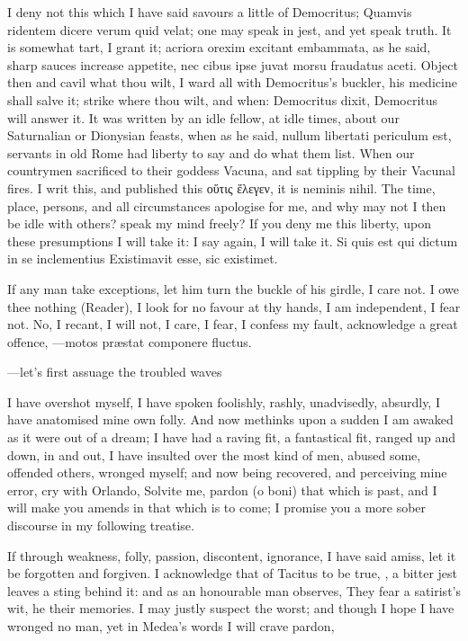 {I deny not this which I have said savours a little of Democritus; 
Quamvis ridentem dicere verum quid velat; one may speak in jest, and
yet speak truth. It is somewhat tart, I grant it; acriora orexim
excitant embammata, as he said, sharp sauces increase appetite,
nec cibus ipse juvat morsu fraudatus aceti. Object then and cavil
what thou wilt, I ward all with Democritus's buckler, his medicine
shall salve it; strike where thou wilt, and when: Democritus dixit,
Democritus will answer it. It was written by an idle fellow, at idle
times, about our Saturnalian or Dionysian feasts, when as he said,
nullum libertati periculum est, servants in old Rome had liberty to say
and do what them list. When our countrymen sacrificed to their goddess
Vacuna, and sat tippling by their Vacunal fires. I writ this, and
published this οὕτις ἕλεγεν, it is neminis nihil. The time, place,
persons, and all circumstances apologise for me, and why may not I then
be idle with others? speak my mind freely? If you deny me this liberty,
upon these presumptions I will take it: I say again, I will take it.
Si quis est qui dictum in se inclementius
Existimavit esse, sic existimet.

If any man take exceptions, let him turn the buckle of his girdle, I
care not. I owe thee nothing (Reader), I look for no favour at thy
hands, I am independent, I fear not.
No, I recant, I will not, I care, I fear, I confess my fault,
acknowledge a great offence,
---motos pr\ae{}stat componere fluctus.

---let's first assuage the troubled waves

I have overshot myself, I have spoken foolishly, rashly, unadvisedly,
absurdly, I have anatomised mine own folly. And now methinks upon a
sudden I am awaked as it were out of a dream; I have had a raving fit,
a fantastical fit, ranged up and down, in and out, I have insulted over
the most kind of men, abused some, offended others, wronged myself; and
now being recovered, and perceiving mine error, cry with Orlando,
Solvite me, pardon (o boni) that which is past, and I will make you
amends in that which is to come; I promise you a more sober discourse
in my following treatise.

If through weakness, folly, passion, discontent, ignorance, I have
said amiss, let it be forgotten and forgiven. I acknowledge that of
 Tacitus to be true, , a bitter jest leaves a sting behind it:
and as an honourable man observes, They fear a satirist's wit, he
their memories. I may justly suspect the worst; and though I hope I
have wronged no man, yet in Medea's words I will crave pardon,

}
